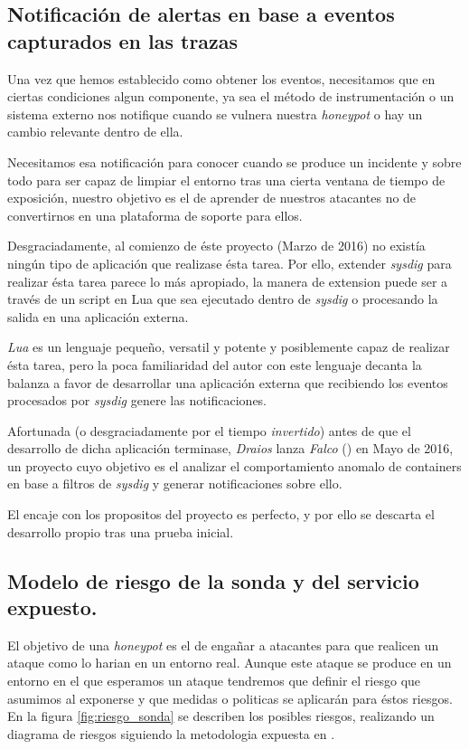 \subsection{Notificación de alertas en base a eventos capturados en las trazas}
\label{subsec:alertas-trazas}

Una vez que hemos establecido como obtener los eventos, necesitamos que en ciertas condiciones algun componente, ya
sea el método de instrumentación o un sistema externo nos notifique cuando se vulnera nuestra \emph{honeypot} o hay un
cambio relevante dentro de ella.

Necesitamos esa notificación para conocer cuando se produce un incidente y sobre todo para ser capaz de limpiar el entorno tras una
cierta ventana de tiempo de exposición, nuestro objetivo es el de aprender de nuestros atacantes no de convertirnos en una plataforma de soporte
para ellos.

Desgraciadamente, al comienzo de éste proyecto (Marzo de 2016) no existía ningún tipo de aplicación que realizase ésta tarea.
Por ello, extender \emph{sysdig} para realizar ésta tarea parece lo más apropiado, la manera de extension puede ser a través de un
script en Lua que sea ejecutado dentro de \emph{sysdig} o procesando la salida en una aplicación externa.

\emph{Lua} es un lenguaje pequeño, versatil y potente y posiblemente capaz de realizar ésta tarea, pero la poca familiaridad del autor con este lenguaje decanta
la balanza a favor de desarrollar una aplicación externa que recibiendo los eventos procesados por \emph{sysdig} genere las notificaciones.

Afortunada (o desgraciadamente por el tiempo \emph{invertido}) antes de que el desarrollo de dicha aplicación terminase, \emph{Draios} lanza \emph{Falco} (\cite{falco-project}) en Mayo de 2016, un proyecto cuyo objetivo
es el analizar el comportamiento anomalo de containers en base a filtros de \emph{sysdig} y generar notificaciones sobre ello.

El encaje con los propositos del proyecto es perfecto, y por ello se descarta el desarrollo propio tras una prueba inicial.

\subsection{Modelo de riesgo de la sonda y del servicio expuesto.}
\label{subsec:riesgos}

El objetivo de una  \emph{honeypot} es el de engañar a atacantes para que realicen un ataque como lo harian en un entorno real. Aunque este ataque se produce en un entorno en el que esperamos un ataque
tendremos que definir el riesgo que asumimos al exponerse y que medidas o politicas se aplicarán para éstos riesgos. En la figura \ref{fig:riesgo_sonda} se describen los posibles riesgos, realizando un diagrama de riesgos siguiendo la metodologia expuesta en \cite{Shostack:2014:TMD:2829295}.

